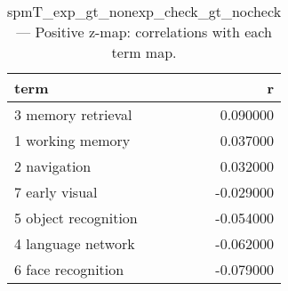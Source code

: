 \begin{table}
\caption{spmT_exp_gt_nonexp_check_gt_nocheck — Positive z-map: correlations with each term map.}
\label{tab:spmT_exp_gt_nonexp_check_gt_nocheck_pos}
\begin{tabular}{lr}
\toprule
term & r \\
\midrule
3 memory retrieval & 0.090000 \\
1 working memory & 0.037000 \\
2 navigation & 0.032000 \\
7 early visual & -0.029000 \\
5 object recognition & -0.054000 \\
4 language network & -0.062000 \\
6 face recognition & -0.079000 \\
\bottomrule
\end{tabular}
\end{table}
